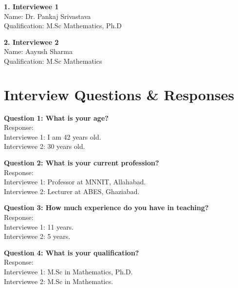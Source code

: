 \documentclass[paper=a4, fontsize=11pt]{report}
\numberwithin{equation}{section}		%
\numberwithin{figure}{section}			%
\numberwithin{table}{section}				%
\begin{document}
\begin{flushleft}
\textbf{1. Interviewee 1}
\\Name: Dr. Pankaj Srivastava 
\\Qualification: M.Sc Mathematics, Ph.D
\end{flushleft}

\begin{flushleft}
\textbf{2. Interviewee 2}
\\Name: Aayush Sharma 
\\Qualification: M.Sc Mathematics
\end{flushleft}

\section{Interview Questions \& Responses}
\begin{flushleft}
\textbf{Question 1: What is your age?}
\\Response:
\\Interviewee 1: I am 42 years old.
\\Interviewee 2: 30 years old.
\\\hrulefill
\end{flushleft}

\begin{flushleft}
\setlength{\parskip}{\baselineskip}
\textbf{Question 2: What is your current profession?}
\\Response:
\\Interviewee 1: Professor at MNNIT, Allahabad.
\\Interviewee 2: Lecturer at ABES, Ghaziabad.
\\\hrulefill
\end{flushleft}

\begin{flushleft}
\setlength{\parskip}{\baselineskip}
\textbf{Question 3: How much experience do you have in teaching?}
\\Response:
\\Interviewee 1: 11 years.
\\Interviewee 2: 5 years.
\\\hrulefill
\end{flushleft}

\begin{flushleft}
\setlength{\parskip}{\baselineskip}
\textbf{Question 4: What is your qualification?}
\\Response:
\\Interviewee 1: M.Sc in Mathematics, Ph.D.
\\Interviewee 2: M.Sc in Mathematics.
\\\hrulefill
\end{flushleft}
\end{document}
